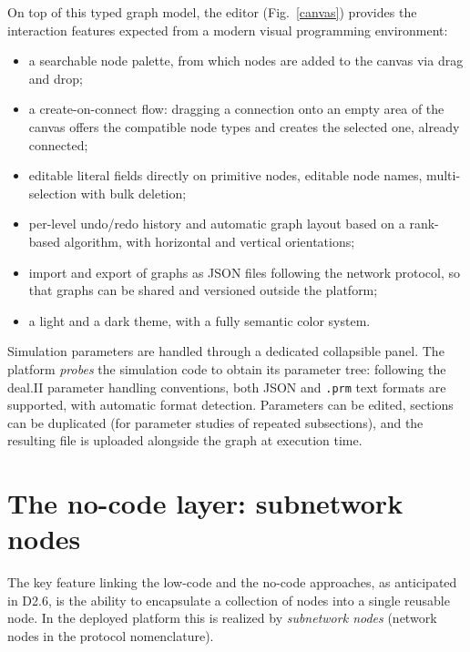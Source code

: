 \documentclass[a4paper,12pt]{article}
\begin{document}
\FloatBarrier

On top of this typed graph model, the editor (Fig.~\ref{canvas}) provides
the interaction features expected from a modern visual programming
environment:

\begin{itemize}
    \item a searchable node palette, from which nodes are added to the
        canvas via drag and drop;
    \item a create-on-connect flow: dragging a connection onto an empty area
        of the canvas offers the compatible node types and creates the
        selected one, already connected;
    \item editable literal fields directly on primitive nodes, editable node
        names, multi-selection with bulk deletion;
    \item per-level undo/redo history and automatic graph layout based on a
        rank-based algorithm, with horizontal and vertical orientations;
    \item import and export of graphs as JSON files following the network
        protocol, so that graphs can be shared and versioned outside the
        platform;
    \item a light and a dark theme, with a fully semantic color system.
\end{itemize}

Simulation parameters are handled through a dedicated collapsible panel.
The platform \emph{probes} the simulation code to obtain its parameter tree:
following the deal.II parameter handling conventions, both JSON and
\texttt{.prm} text formats are supported, with automatic format detection.
Parameters can be edited, sections can be duplicated (for parameter studies
of repeated subsections), and the resulting file is uploaded alongside the
graph at execution time.

\section{\textcolor{EUblue}{The no-code layer: subnetwork nodes}}

The key feature linking the low-code and the no-code approaches, as
anticipated in D2.6, is the ability to encapsulate a collection of nodes
into a single reusable node. In the deployed platform this is realized by
\emph{subnetwork nodes} (network nodes in the protocol nomenclature).
\end{document}
